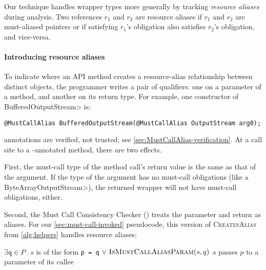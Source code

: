 Our technique handles wrapper types more generally by tracking \emph{resource
aliases} during analysis.  Two references $r_1$ and $r_2$ are resource aliases
if $r_1$ and $r_2$ are must-aliased pointers or if
satisfying $r_1$'s \MustCall obligation also satisfies $r_2$'s
  obligation, and vice-versa.

\paragraph{Introducing resource aliases}
To indicate where an API method creates a resource-alias
relationship between distinct objects, the programmer writes a pair of 
\MustCallAlias qualifiers:  one on a parameter
of a method, and another on its return type.
For example, one constructor of \<BufferedOutputStream> is:
\begin{lstlisting}[aboveskip=0.5em,belowskip=0.5em]
@MustCallAlias BufferedOutputStream(@MustCallAlias OutputStream arg0);
\end{lstlisting}
\noindent
\MustCallAlias annotations are verified, not trusted; see \cref{sec:MustCallAlias-verification}.
At a call site to a \MustCallAlias-annotated method, there are two effects.

First, the must-call type of the method call's return value
is the same as that of the \MustCallAlias
argument.  If the type of the argument has no must-call obligations (like a
\<ByteArrayOutputStream>), the returned wrapper will not have must-call
obligations, either.

Second,
the Must Call Consistency Checker
() treats the \MustCallAlias parameter and return as
aliases.  For our \cref{sec:must-call-invoked} pseudocode, this
version of \textsc{CreatesAlias} from \cref{alg:helpers} handles resource aliases:
\begin{algorithmic}
    \State \Return $\exists \mathtt{q} \in P\ .\ s$ is of the form \texttt{p = q}\newline
         \hspace*{8em} $\vee\ \textsc{IsMustCallAliasParam}(s,q)$ 
  \EndProcedure
    \State \Return $s$ passes $p$ to a \MustCallAlias parameter of its callee
  \EndProcedure
\end{algorithmic}



